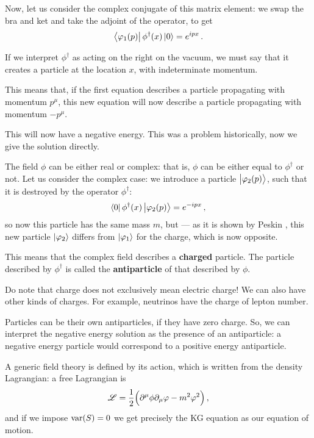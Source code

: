 \documentclass[main.tex]{subfiles}
\begin{document}
Now, let us consider the complex conjugate of this matrix element: we swap the bra and ket and take the adjoint of the operator, to get 
%
\begin{align}
\bra{\varphi_1 (p)} \phi ^\dag (x) \ket{0} = e^{ipx}
\,.
\end{align}

If we interpret \(\phi ^\dag\) as acting on the right on the vacuum, we must say that it creates a particle at the location \(x\), with indeterminate momentum.

This means that, if the first equation describes a particle propagating with momentum \(p^{\mu }\), this new equation will now describe a particle propagating with momentum \(- p^{\mu }\). 

This will now have a negative energy. 
This was a problem historically, now we give the solution directly. 

The field \(\phi \) can be either real or complex: that is, \(\phi \) can be either equal to \(\phi ^\dag\) or not. Let us consider the complex case:
we introduce a particle \(\ket{\varphi_2 (p)}\), such that it is destroyed by the operator \(\phi ^\dag \):
%
\begin{align}
\bra{0} \phi ^\dag (x) \ket{\varphi_2 (p)} = e^{-ipx}
\,,
\end{align}
%
so now this particle  has the same mass \(m\), but --- as it is shown by Peskin \cite[sec.\ 3.5]{peskinConceptsElementaryParticle2019}, this new particle \(\ket{\varphi_2}\) differs from \(\ket{\varphi_1 }\) for the charge, which is now opposite. 

This means that the complex field describes a \textbf{charged} particle.
The particle described by \(\phi ^\dag\) is called the \textbf{antiparticle} of that described by \(\phi\).  

Do note that charge does not exclusively mean electric charge! We can also have other kinds of charges. 
For example, neutrinos have the charge of lepton number. 

Particles can be their own antiparticles, if they have zero charge.
So, we can interpret the negative energy solution as the presence of an antiparticle: 
a negative energy particle would correspond to a positive energy antiparticle. 

A generic field theory is defined by its action, which is written from the density Lagrangian: a free Lagrangian is  
%
\begin{align}
\mathscr{L} = \frac{1}{2} \qty(\partial^{\mu } \phi \partial_{\mu } \varphi - m^2 \varphi^2)
\,,
\end{align}
%
and if we impose \(\text{var} \qty(S)=0\) we get precisely the KG equation as our equation of motion. 
\end{document}
